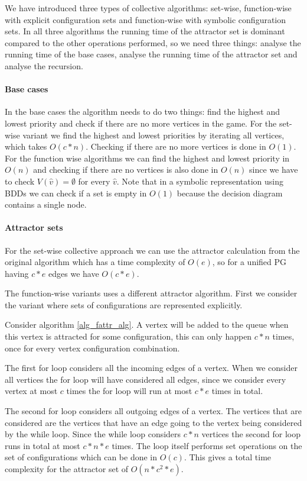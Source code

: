 We have introduced three types of collective algorithms: set-wise, function-wise with explicit configuration sets and function-wise with symbolic configuration sets. In all three algorithms the running time of the attractor set is dominant compared to the other operations performed, so we need three things: analyse the running time of the base cases, analyse the running time of the attractor set and analyse the recursion.

\paragraph{Base cases} In the base cases the algorithm needs to do two things: find the highest and lowest priority and check if there are no more vertices in the game. For the set-wise variant we find the highest and lowest priorities by iterating all vertices, which takes $O(c*n)$. Checking if there are no more vertices is done in $O(1)$. For the function wise algorithms we can find the highest and lowest priority in $O(n)$ and checking if there are no vertices is also done in $O(n)$ since we have to check $V(\hat{v}) = \emptyset$ for every $\hat{v}$. Note that in a symbolic representation using BDDs we can check if a set is empty in $O(1)$ because the decision diagram contains a single node.

\paragraph{Attractor sets} For the set-wise collective approach we can use the attractor calculation from the original algorithm which has a time complexity of $O(e)$, so for a unified PG having $c*e$ edges we have $O(c*e)$.

The function-wise variants uses a different attractor algorithm. First we consider the variant where sets of configurations are represented explicitly.

Consider algorithm \ref{alg_fattr_alg}. A vertex will be added to the queue when this vertex is attracted for some configuration, this can only happen $c*n$ times, once for every vertex configuration combination. 

The first for loop considers all the incoming edges of a vertex. When we consider all vertices the for loop will have considered all edges, since we consider every vertex at most $c$ times the for loop will run at most $c*e$ times in total.

The second for loop considers all outgoing edges of a vertex. The vertices that are considered are the vertices that have an edge going to the vertex being considered by the while loop. Since the while loop considers $c*n$ vertices the second for loop runs in total at most $c * n * e$ times. The loop itself performs set operations on the set of configurations which can be done in $O(c)$. This gives a total time complexity for the attractor set of $O(n*c^2*e)$.

